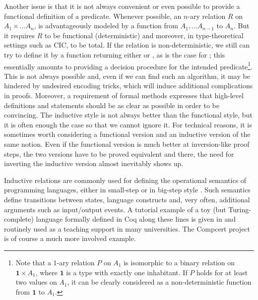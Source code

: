 Another issue is that it is not always convenient or even possible to
provide a functional definition of a predicate.
Whenever possible,
an $n$-ary relation $R$ on $A_1 \times \ldots A_n$, %
is advantageously modeled by a function from $A_1, \ldots A_{n-1}$ to $A_n$.
But it requires $R$ to be functional (deterministic) and moreover,
in type-theoretical settings such as CIC, to be total.
If the relation is non-deterministic,
we still can try to 
define it by a function returning either 
or , as is the case for ;
this essentially amounts to providing a decision procedure for 
the intended predicate\footnote{
Note that a 1-ary relation $P$ on $A_1$ is isomorphic to a 
binary relation on $\mathbf{1}\times A_1$,
where $\mathbf{1}$ is a type with exactly one inhabitant.
If $P$ holds for at least two values on $A_1$, 
it can be clearly considered as a non-deterministic 
function from $\mathbf{1}$ to $A_1$.
}.
This is not always possible 
%
%
and, even if we can find such an
algorithm, it may be hindered by undesired encoding tricks,
which will induce additional complications in proofs. 
Moreover, a requirement of formal methods expresses that
high-level definitions and statements should be as clear 
as possible in order to be convincing. 
The inductive style is not always better than the functional
style, but it is often enough the case so that we cannot
ignore it. 
For technical reasons, it is sometimes worth considering
a functional version and an inductive version of the same notion.
Even if the functional version is much better at inversion-like
proof steps, 
the two versions have to be proved equivalent and there,
the need for inverting the inductive version almost inevitably shows up.

Inductive relations are commonly used for defining
the operational semantics of programming languages,
either in small-step or in big-step style \cite{nielson}. 
Such semantics define transitions between states,
language constructs and,
very often, additional arguments such as input/output events. 
A tutorial example of a toy (but Turing-complete) language 
formally defined in Coq along these lines
is given in \cite{Pierce:SF}
and routinely used as a teaching support in many universities.
The Compcert project \cite{Leroy-Compcert-CACM}
is of course a much more involved example.
  

